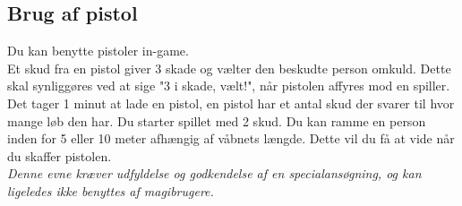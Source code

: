 \subsection*{Brug af pistol}
Du kan benytte pistoler in-game.\\
Et skud fra en pistol giver 3 skade og vælter den beskudte person omkuld. Dette skal synliggøres ved at sige "3 i skade, vælt!", når pistolen affyres mod en spiller.\\
Det tager 1 minut at lade en pistol, en pistol har et antal skud der svarer til hvor mange løb den har. Du starter spillet med 2 skud. Du kan ramme en person inden for 5 eller 10 meter afhængig af våbnets længde. Dette vil du få at vide når du skaffer pistolen.\\
\emph{Denne evne kræver udfyldelse og godkendelse af en specialansøgning, og kan ligeledes ikke benyttes af magibrugere.}\\
